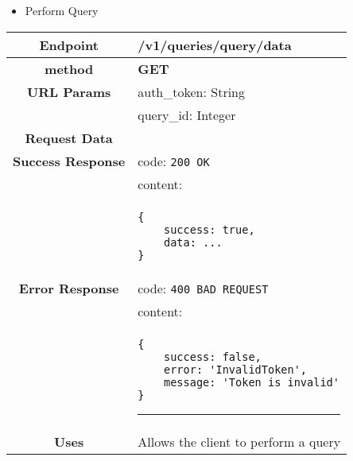     \begin{itemize}
        \item Perform Query
    \end{itemize}
    \begin{adjustwidth}{1cm}{}
        \begin{longtable}{|c|l|}
            \hline
            \textbf{Endpoint} & /v1/queries/query/data \\
            \hline
            \textbf{method} & \textbf{GET} \\
            \hline
            \textbf{URL Params} &  auth\_token: String \\
            &  query\_id: Integer \\
            \hline
            \textbf{Request Data} & \\
            \hline
            \textbf{Success Response} & code: \texttt{200 OK} \\
            &                           content: \\
            & \begin{minipage}[t]{0.5\textwidth}
                \begin{adjustwidth}{1.5cm}{}
                \begin{verbatim}
{
    success: true,
    data: ...
}
                \end{verbatim}
                \end{adjustwidth}
              \end{minipage} \\
              \hline
            \textbf{Error Response} & code: \texttt{400 BAD REQUEST} \\
              &                     content: \\
              & \begin{minipage}[t]{0.7\textwidth}
                \begin{adjustwidth}{1.5cm}{}
                \begin{verbatim}
{
    success: false, 
    error: 'InvalidToken',
    message: 'Token is invalid'
}
                \end{verbatim}
                \end{adjustwidth}
                \par\noindent\rule{\textwidth}{1pt}
                 \vspace{4pt}
              \end{minipage} \\
              \hline
            \textbf{Uses} & Allows the client to perform a query \\

\end{longtable}
\end{adjustwidth}
